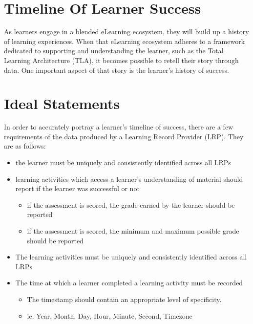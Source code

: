 \documentclass{article}
\begin{document}
\section*{Timeline Of Learner Success}
As learners engage in a blended eLearning ecosystem, they will build up a history of learning experiences. When that eLearning ecosystem adheres to a framework dedicated to supporting and understanding the learner, such as the Total Learning Architecture (TLA), it becomes possible to retell their story through data. One important aspect of that story is the learner's history of success.

\section{Ideal Statements}
In order to accurately portray a learner's timeline of success, there are a few requirements of the data produced by a Learning Record Provider (LRP). They are as follows:
\begin{itemize}
\item the learner must be uniquely and consistently identified across all LRPs
\item learning activities which access a learner's understanding of material should report if the learner was successful or not
  \begin{itemize}
  \item if the assessment is scored, the grade earned by the learner should be reported
  \item if the assessment is scored, the minimum and maximum possible grade should be reported
  \end{itemize}
\item The learning activities must be uniquely and consistently identified across all LRPs
\item The time at which a learner completed a learning activity must be recorded
  \begin{itemize}
  \item The timestamp should contain an appropriate level of specificity.
  \item ie. Year, Month, Day, Hour, Minute, Second, Timezone
  \end{itemize}
\end{itemize}
\end{document}

